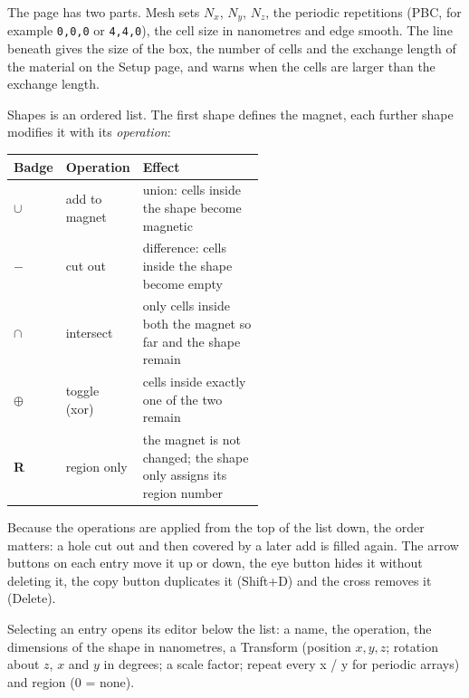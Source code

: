 \documentclass[11pt,a4paper,oneside]{book}
\newcommand{\code}[1]{\texttt{#1}}
\renewcommand{\_}{\textunderscore\allowbreak}
\newcommand{\menu}[1]{\textsf{#1}}
\begin{document}
The page has two parts. \menu{Mesh} sets $N_x$, $N_y$, $N_z$, the periodic repetitions (\menu{PBC}, for example
\code{0,0,0} or \code{4,4,0}), the cell size in nanometres and \menu{edge smooth}. The line beneath gives the size
of the box, the number of cells and the exchange length of the material on the Setup page, and warns when the
cells are larger than the exchange length.

\menu{Shapes} is an ordered list. The first shape defines the magnet, each further shape modifies it with its
\emph{operation}:
\begin{center}
\begin{tabular}{>{\bfseries}l l p{0.55\linewidth}}
\toprule
Badge & Operation & Effect \\
\midrule
$\cup$ & add to magnet & union: cells inside the shape become magnetic \\
$-$ & cut out & difference: cells inside the shape become empty \\
$\cap$ & intersect & only cells inside both the magnet so far and the shape remain \\
$\oplus$ & toggle (xor) & cells inside exactly one of the two remain \\
R & region only & the magnet is not changed; the shape only assigns its region number \\
\bottomrule
\end{tabular}
\end{center}
Because the operations are applied from the top of the list down, the order matters: a hole cut out and then
covered by a later \menu{add} is filled again. The arrow buttons on each entry move it up or down, the eye button
hides it without deleting it, the copy button duplicates it (Shift+D) and the cross removes it (Delete).

Selecting an entry opens its editor below the list: a name, the operation, the dimensions of the shape in
nanometres, a \menu{Transform} (position $x, y, z$; rotation about $z$, $x$ and $y$ in degrees; a scale factor;
\menu{repeat every x / y} for periodic arrays) and \menu{region (0 = none)}.
\end{document}
